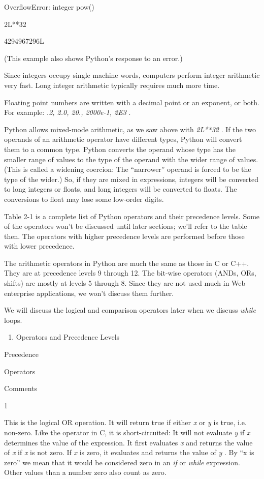 OverflowError: integer pow()


2L**32

4294967296L

(This example also shows Python's
response to an error.)

Since integers occupy single
machine words, computers perform integer arithmetic very fast. Long
integer arithmetic typically requires much more time.

Floating point numbers are written
with a decimal point or an exponent, or both. For example: \emph{.2,
2.0, 20., 2000e-1, 2E3} .

Python allows mixed-mode
arithmetic, as we saw above with \emph{2L**32} . If the two operands of
an arithmetic operator have different types, Python will convert them to
a common type. Python converts the operand whose type has the smaller
range of values to the type of the operand with the wider range of
values. (This is called a widening coercion: The ``narrower'' operand is
forced to be the type of the wider.) So, if they are mixed in
expressions, integers will be converted to long integers or floats, and
long integers will be converted to floats. The conversions to float may
lose some low-order digits.


Table 2-1 is a complete list of
Python operators and their precedence levels. Some of the operators
won't be discussed until later sections; we'll refer to the table then.
The operators with higher precedence levels are performed before those
with lower precedence.

The arithmetic operators in Python
are much the same as those in C or C++. They are at precedence levels 9
through 12. The bit-wise operators (ANDs, ORs, shifts) are mostly at
levels 5 through 8. Since they are not used much in Web enterprise
applications, we won't discuss them further.

We will discuss the logical and
comparison operators later when we discuss \emph{while} loops.

\begin{enumerate}
\tightlist
\item Operators and Precedence Levels
\end{enumerate}

Precedence

Operators

Comments

1



This is the logical OR operation.
It will return true if either \emph{x} or \emph{y} is true, i.e.
non-zero. Like the \emph{\textbar{}\textbar{}} operator in C, it is
short-circuited: It will not evaluate \emph{y} if \emph{x} determines
the value of the expression. It first evaluates \emph{x} and returns the
value of \emph{x} if \emph{x} is not zero. If \emph{x} is zero, it
evaluates and returns the value of \emph{y} . By ``x is zero'' we mean
that it would be considered zero in an \emph{if} or \emph{while}
expression. Other values than a number zero also count as zero.

